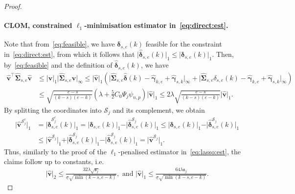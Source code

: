 \documentclass[11pt, a4paper]{article}
\newcommand{\mbf}{\mathbf}
\newcommand{\mc}{\mathcal}
\renewcommand{\l}{\left}
\renewcommand{\r}{\right}
\def\wh{\widehat}
\theoremstyle{definition}
\theoremstyle{definition}
\theoremstyle{definition}
\theoremstyle{definition}
\theoremstyle{definition}
\theoremstyle{remark}
\theoremstyle{definition}
\theoremstyle{definition}
\theoremstyle{definition}
\begin{document}
\begin{proof}
	\paragraph{CLOM, constrained $\ell_1$-minimisation estimator in~\eqref{eq:direct:est}.}
	Note that from~\eqref{eq:feasible}, we have $\bm\delta_{s, e}(k)$ feasible for the constraint in~\eqref{eq:direct:est}, from which it follows that $\vert \wh{\bm\delta}_{s, e}(k) \vert_1 \le \vert \bm\delta_{s, e}(k) \vert_1$.
	Then, by~\eqref{eq:feasible} and the definition of $\wh{\bm\delta}_{s, e}(k)$, we have
	\begin{align*}
	\wh{\mbf v}^\top \wh{\bm\Sigma}_{s, e} \wh{\mbf v} &\le \vert\wh{\mbf v} \vert_1 \vert \wh{\bm\Sigma}_{s, e} \wh{\mbf v} \vert_\infty  \le \vert\wh{\mbf v} \vert_1 \l(\bigl\vert\wh{\bm\Sigma}_{s, e}\wh{\bm \delta}(k) - \wh{\bm\gamma}_{k, e} + \wh{\bm\gamma}_{s, k}\bigr\vert_{\infty} + \bigl\vert\wh{\bm\Sigma}_{s, e}\delta_{s, e}(k) - \wh{\bm\gamma}_{k, e} + \wh{\bm\gamma}_{s, k}\bigr\vert_{\infty}\r)\\
	& \le \sqrt{\frac{e - s}{(k - s) (e - k)}} \l(\lambda + \frac{5}{2}C_0 \Psi_j \psi_{n,p}\r) \vert\wh{\mbf v} \vert_1 \le 
	2\lambda \sqrt{\frac{e - s}{(k - s) (e - k)}} \vert\wh{\mbf v} \vert_1.
	\end{align*}
	By splitting the coordinates into $\mc S_j$ and its complement, we obtain
	\begin{align*}
	\vert \wh{\mbf v}^{\mc S_j^c} \vert_1 &= \vert \wh{\bm \delta}^{\mc S_j^c}_{s, e}(k) \vert_1 = \vert \wh{\bm \delta}_{s, e}(k) \vert_1 - \vert \wh{\bm \delta}^{\mc S_j}_{s, e}(k) \vert_1 \le \vert \bm \delta_{s, e}(k) \vert_1 - \vert \wh{\bm \delta}^{\mc S_j}_{s, e}(k) \vert_1 
	\\
	&\le \vert \wh{\mbf v}^{\mc S_j} \vert_1 + \vert \wh{\bm \delta}^{\mc S_j}_{s, e}(k) \vert_1 - \vert \wh{\bm \delta}^{\mc S_j}_{s, e}(k) \vert_1 = \vert \wh{\mbf v}^{\mc S_j} \vert_1.
	\end{align*}
	Thus, similarly to the proof of the $\ell_1$-penalised estimator in~\eqref{eq:lasso:est}, the claims follow up to constants, i.e.\ 
	\begin{align*}
	\vert \wh{\mbf v} \vert_2 \le \frac{32 \lambda \sqrt{\mathfrak{s}_j}}{\underline{\sigma} \sqrt{\min(k - s, e - k)}},
	\text{ \ and \ }
	\vert \wh{\mbf v} \vert_1 \le \frac{64 \lambda \mathfrak{s}_j}{\underline{\sigma} \sqrt{\min(k - s, e - k)}}.
	\end{align*}
\end{proof}
\end{document}
